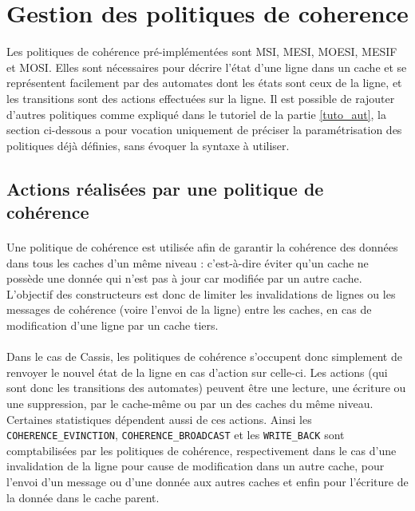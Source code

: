 \section{Gestion des politiques de coherence}

Les politiques de cohérence pré-implémentées sont MSI, MESI, MOESI, MESIF et MOSI. Elles sont nécessaires pour décrire l'état d'une ligne dans un cache et se représentent facilement par des automates dont les états sont ceux de la ligne, et les transitions sont des actions effectuées sur la ligne. Il est possible de rajouter d'autres politiques comme expliqué dans le tutoriel de la partie \ref{tuto_aut}, la section ci-dessous a pour vocation uniquement de préciser la paramétrisation des politiques déjà définies, sans évoquer la syntaxe à utiliser.

\subsection{Actions réalisées par une politique de cohérence}

\paragraph{}
Une politique de cohérence est utilisée afin de garantir la cohérence des données dans tous les caches d'un même niveau : c'est-à-dire éviter qu'un cache ne possède une donnée qui n'est pas à jour car modifiée par un autre cache. L'objectif des constructeurs est donc de limiter les invalidations de lignes ou les messages de cohérence (voire l'envoi de la ligne) entre les caches, en cas de modification d'une ligne par un cache tiers. 

\paragraph{}
Dans le cas de \textsf{Cassis}, les politiques de cohérence s'occupent donc simplement de renvoyer le nouvel état de la ligne en cas d'action sur celle-ci. Les actions (qui sont donc les transitions des automates) peuvent être une lecture, une écriture ou une suppression, par le cache-même ou par un des caches du même niveau. Certaines statistiques dépendent aussi de ces actions. Ainsi les \verb!COHERENCE_EVINCTION!, \verb!COHERENCE_BROADCAST! et les \verb!WRITE_BACK! sont comptabilisées par les politiques de cohérence, respectivement dans le cas d'une invalidation de la ligne pour cause de modification dans un autre cache, pour l'envoi d'un message ou d'une donnée aux autres caches et enfin pour l'écriture de la donnée dans le cache parent. 


